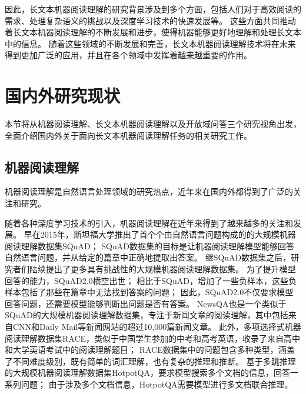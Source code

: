 因此，长文本机器阅读理解的研究背景涉及到多个方面，包括人们对于高效阅读的需求、处理复杂语义的挑战以及深度学习技术的快速发展等。
这些方面共同推动着长文本机器阅读理解的不断发展和进步，使得机器能够更好地理解和处理长文本中的信息。
随着这些领域的不断发展和完善，长文本机器阅读理解技术将在未来得到更加广泛的应用，并且在各个领域中发挥着越来越重要的作用。


\section{国内外研究现状}
本节将从机器阅读理解、长文本机器阅读理解以及开放域问答三个研究视角出发，全面介绍国内外关于面向长文本机器阅读理解任务的相关研究工作。

\subsection{机器阅读理解}
机器阅读理解\cite{hermann2015teaching}是自然语言处理领域的研究热点，近年来在国内外都得到了广泛的关注和研究。

随着各种深度学习技术的引入，机器阅读理解在近年来得到了越来越多的关注和发展。
早在2015年，斯坦福大学推出了首个个由自然语言问题构成的的大规模机器阅读理解数据集SQuAD\cite{rajpurkar2016squad}；
SQuAD数据集的目标是让机器阅读理解模型能够回答自然语言问题，并从给定的篇章中正确地提取出答案。
继SQuAD数据集之后，研究者们陆续提出了更多具有挑战性的大规模机器阅读理解数据集。
为了提升模型回答的能力，SQuAD2.0\cite{Rajpurkar2018KnowWY}横空出世；
相比于SQuAD，增加了一些负样本，这些负样本包括了那些在篇章中无法找到答案的问题；
因此，SQuAD2.0不仅要求模型回答问题，还需要模型能够判断出问题是否有答案。
NewsQA\cite{trischler2016newsqa}也是一个类似于SQuAD的大规模机器阅读理解数据集，专注于新闻文章的阅读理解，其中包括来自CNN和Daily Mail等新闻网站的超过10,000篇新闻文章。
此外，多项选择式机器阅读理解数据集RACE\cite{lai2017race}，类似于中国学生参加的中考和高考英语，收录了来自高中和大学英语考试中的阅读理解题目；
RACE数据集中的问题包含多种类型，涵盖了不同难度级别，既有简单的词汇理解，也有复杂的推理和推断。
基于多跳推理的大规模机器阅读理解数据集HotpotQA\cite{Yang2018HotpotQAAD}，要求模型搜索多个文档的信息，回答一系列问题；
由于涉及多个文档信息，HotpotQA需要模型进行多文档联合推理。

